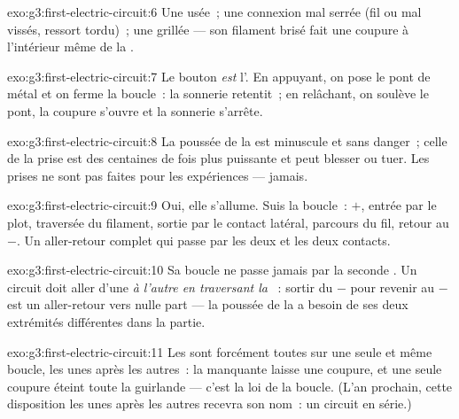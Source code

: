 \begin{solution}{exo:g3:first-electric-circuit:6}
Une  usée~; une connexion mal serrée (fil ou  mal vissés,
ressort tordu)~; une  grillée --- son filament brisé fait une
coupure à l'intérieur même de la .
\end{solution}

\begin{solution}{exo:g3:first-electric-circuit:7}
Le bouton \emph{est} l'. En appuyant, on pose le pont de
métal et on ferme la boucle~: la sonnerie retentit~; en relâchant, on
soulève le pont, la coupure s'ouvre et la sonnerie s'arrête.
\end{solution}

\begin{solution}{exo:g3:first-electric-circuit:8}
La poussée de la  est minuscule et sans danger~; celle de la
prise est des centaines de fois plus puissante et peut blesser ou
tuer. Les prises ne sont pas faites pour les expériences --- jamais.
\end{solution}

\begin{solution}{exo:g3:first-electric-circuit:9}
Oui, elle s'allume. Suis la boucle~:  $+$, entrée par le plot,
traversée du filament, sortie par le contact latéral, parcours du
fil, retour au $-$. Un aller-retour complet qui passe par les deux
 et les deux contacts.
\end{solution}

\begin{solution}{exo:g3:first-electric-circuit:10}
Sa boucle ne passe jamais par la seconde . Un circuit doit aller
d'une  \emph{à l'autre en traversant la }~: sortir du $-$
pour revenir au $-$ est un aller-retour vers nulle part --- la
poussée de la  a besoin de ses deux extrémités différentes dans
la partie.
\end{solution}

\begin{solution}{exo:g3:first-electric-circuit:11}
Les  sont forcément toutes sur une seule et même boucle, les
unes après les autres~: la  manquante laisse une coupure, et une
seule coupure éteint toute la guirlande --- c'est la loi de la
boucle. (L'an prochain, cette disposition les unes après les autres
recevra son nom~: un circuit en série.)
\end{solution}
